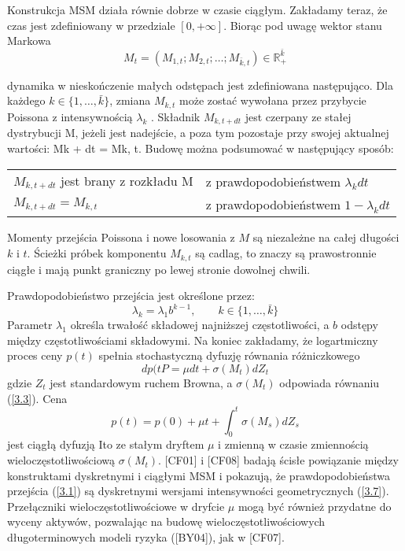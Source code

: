 \documentclass[12pt]{article}
\theoremstyle{definition}
\begin{document}
Konstrukcja MSM działa równie dobrze w czasie ciągłym. Zakładamy teraz, że czas jest zdefiniowany w przedziale $[0, +\infty]$. Biorąc pod uwagę wektor stanu Markowa
$$M_t = (M_{1,t}; M_{2,t}; \ldots; M_{\bar{k},t}) \in \mathbb{R}^{\bar{k}}_{+}$$

dynamika w nieskończenie małych odstępach jest zdefiniowana następująco. Dla każdego $k \in \{1, \ldots, \bar{k}\}$, zmiana $M_{k,t}$ może zostać wywołana przez przybycie Poissona z intensywnością $\lambda_k$ . Składnik $M_{k,t+dt}$ jest czerpany ze stałej dystrybucji M, jeżeli jest nadejście, a poza tym pozostaje przy swojej aktualnej wartości: Mk + dt = Mk, t. Budowę można podsumować w następujący sposób:

\begin{tabular}{l l}
$M_{k, t +dt}$ jest brany z rozkładu M & z prawdopodobieństwem $\lambda_k dt$\\
$M_{k, t +dt} = M_{k, t}$ & z prawdopodobieństwem $1 - \lambda_k dt$\\
\end{tabular}

Momenty przejścia Poissona i nowe losowania z $M$ są niezależne na całej długości $k$ i $t$. Ścieżki próbek komponentu $M_{k,t}$ są cadlag, to znaczy są prawostronnie ciągłe i mają punkt graniczny po lewej stronie dowolnej chwili.

Prawdopodobieństwo przejścia jest określone przez:
\begin{equation}
\label{3.7}
\lambda_k = \lambda_1 b^{k-1}, \qquad k\in \{1, \ldots, \bar{k} \}
\end{equation}
Parametr $\lambda_1$ określa trwałość składowej najniższej częstotliwości, a $b$ odstępy między częstotliwościami składowymi.
Na koniec zakładamy, że logartmiczny proces ceny $p(t)$ spełnia stochastyczną dyfuzję równania różniczkowego
\begin{equation}
\label{3.8}
dp(tP = \mu dt + \sigma(M_t) dZ_t
\end{equation}
gdzie $Z_t$ jest standardowym ruchem Browna, a $\sigma (M_t)$ odpowiada równaniu (\ref{3.3}). Cena
\begin{equation}
\label{3.9}
p(t) = p(0) + \mu t + \int_{0}^{t} \sigma(M_s)dZ_s
\end{equation}
jest ciągłą dyfuzją Ito ze stałym dryftem $\mu$ i zmienną w czasie zmiennością wieloczęstotliwościową $\sigma (M_t)$. [CF01] i [CF08] badają ścisłe powiązanie między konstruktami dyskretnymi i ciągłymi MSM i pokazują, że prawdopodobieństwa przejścia (\ref{3.1}) są dyskretnymi wersjami intensywności geometrycznych (\ref{3.7}). Przełączniki wieloczęstotliwościowe w dryfcie $\mu$ mogą być również przydatne do wyceny aktywów, pozwalając na budowę wieloczęstotliwościowych długoterminowych modeli ryzyka ([BY04]), jak w [CF07].
\end{document}
